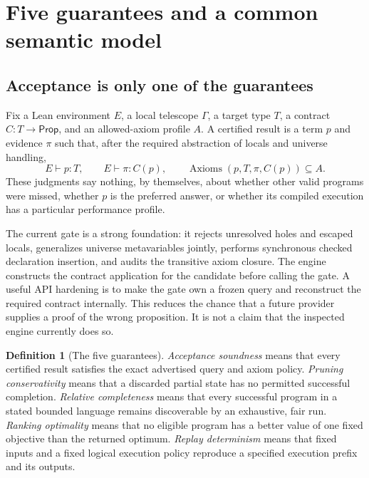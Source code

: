\documentclass[11pt,a4paper]{article}
\theoremstyle{definition}
\newtheorem{definition}[theorem]{Definition}
\theoremstyle{remark}
\begin{document}
\section{Five guarantees and a common semantic model}\label{sec:guarantees}

\subsection{Acceptance is only one of the guarantees}

Fix a Lean environment $E$, a local telescope $\Gamma$, a target type $T$, a contract $C:T\to\mathsf{Prop}$, and an allowed-axiom profile $A$. A certified result is a term $p$ and evidence $\pi$ such that, after the required abstraction of locals and universe handling,
\[
 E\vdash p:T,\qquad E\vdash\pi:C(p),\qquad
 \operatorname{Axioms}(p,T,\pi,C(p))\subseteq A.
\]
These judgments say nothing, by themselves, about whether other valid programs were missed, whether $p$ is the preferred answer, or whether its compiled execution has a particular performance profile.

The current gate is a strong foundation: it rejects unresolved holes and escaped locals, generalizes universe metavariables jointly, performs synchronous checked declaration insertion, and audits the transitive axiom closure. The engine constructs the contract application for the candidate before calling the gate.\cite{repo-gate,repo-engine} A useful API hardening is to make the gate own a frozen query and reconstruct the required contract internally. This reduces the chance that a future provider supplies a proof of the wrong proposition. It is not a claim that the inspected engine currently does so.

\begin{definition}[The five guarantees]
\label{def:guarantees}
\emph{Acceptance soundness} means that every certified result satisfies the exact advertised query and axiom policy. \emph{Pruning conservativity} means that a discarded partial state has no permitted successful completion. \emph{Relative completeness} means that every successful program in a stated bounded language remains discoverable by an exhaustive, fair run. \emph{Ranking optimality} means that no eligible program has a better value of one fixed objective than the returned optimum. \emph{Replay determinism} means that fixed inputs and a fixed logical execution policy reproduce a specified execution prefix and its outputs.
\end{definition}
\end{document}
